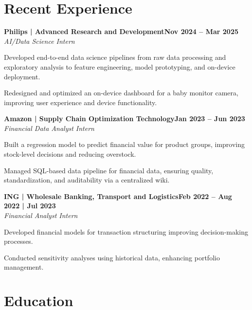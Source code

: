 \documentclass[letterpaper,10pt]{article}
\newcommand{\heading}[2]{
  \hspace{10pt}#1\hfill#2\\
}
\newcommand{\headingBf}[2]{
  \heading{\textbf{#1}}{\textbf{#2}}
}
\newcommand{\headingIt}[2]{
  \heading{\textit{#1}}{\textit{#2}}
}
\newenvironment{resume_list}{
  \vspace{-7pt}
  \begin{itemize}[itemsep=2pt, parsep=1pt, leftmargin=30pt]
}{
  \end{itemize}
}
\begin{document}
  \section{Recent Experience}

  \headingBf{Philips | Advanced Research and Development}{Nov 2024 -- Mar 2025}
  \headingIt{AI/Data Science Intern}{}
  \begin{resume_list}
      \item Developed end-to-end data science pipelines from raw data processing and exploratory analysis to feature engineering, model prototyping, and on-device deployment.
      \item Redesigned and optimized an on-device dashboard for a baby monitor camera, improving user experience and device functionality.
  \end{resume_list}

  \headingBf{Amazon | Supply Chain Optimization Technology}{Jan 2023 -- Jun 2023}
  \headingIt{Financial Data Analyst Intern}{}
  \begin{resume_list}
      \item Built a regression model to predict financial value for product groups, improving stock-level decisions and reducing overstock.
      \item Managed SQL-based data pipeline for financial data, ensuring quality, standardization, and auditability via a centralized wiki.

  \end{resume_list}
  
  \headingBf{ING | Wholesale Banking, Transport and Logistics}{Feb 2022 -- Aug 2022 | Jul 2023}
  \headingIt{Financial Analyst Intern}{}
  \begin{resume_list}
      \item Developed financial models for transaction structuring improving decision-making processes.
      \item Conducted sensitivity analyses using historical data, enhancing portfolio management.

  \end{resume_list}



  \section{Education}
\end{document}
